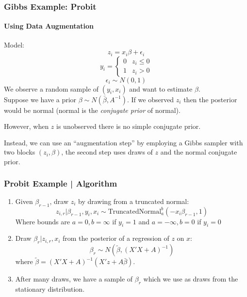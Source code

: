 \documentclass[11pt, aspectratio=169]{beamer}
\begin{document}
\begin{frame}[c]\frametitle{Gibbs Example: Probit}
\framesubtitle{Using Data Augmentation}
    
Model: 
$$ z_i = x_i \beta + \epsilon_i $$
$$ y_i = \begin{cases} 0 & z_i \leq 0 \\ 1 & z_i > 0 \end{cases}$$
$$ \epsilon_i \sim N(0, 1)$$
We observe a random sample of $(y_i, x_i)$ and want to estimate $\beta$. \\

\vspace{1em}
Suppose we have a prior $\beta \sim N(\bar{\beta}, A^{-1})$. If we observed $z_i$ then the posterior would be normal (normal is the \emph{conjugate prior} of normal). 

\vspace{1em}
However, when $z$ is unobserved there is no simple conjugate prior.  

\vspace{1em}
Instead, we can use an ``augmentation step'' by employing a Gibbs sampler with two blocks $(z_i, \beta)$, the second step uses draws of $z$ and the normal conjugate prior.

\end{frame}


\begin{frame}[c]\frametitle{Probit Example | Algorithm}
    
\begin{enumerate}
\item Given $\beta_{r-1}$, draw $z_i$ by drawing from a truncated normal: 
$$ z_{i, r} | \beta_{r-1}, y_i, x_i \sim \mbox{TruncatedNormal}_a^b(-x_i \beta_{r-1}, 1) $$
Where bounds are $a = 0, b = \infty$ if $y_i = 1$ and $a = -\infty, b = 0$ if $y_i = 0$
\item Draw $\beta_r | z_{i,r}, x_i$ from the posterior of a regression of $z$ on $x$:
$$\beta_r \sim N(\tilde{\beta}, (X'X + A)^{-1})$$
where $\tilde{\beta} = (X'X + A)^{-1}(X'z + A\bar{\beta})$. 
\item After many draws, we have a sample of $\beta_r$ which we use as draws from the stationary distribution. 
\end{enumerate}    

\end{frame}
\end{document}

